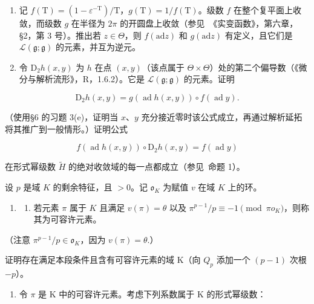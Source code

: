 \begin{enumerate}
\def\labelenumi{(\alph{enumi})}
\item
  记 \(f(\mathrm{T}) = (1 - \varepsilon^{-\mathrm{T}}) / \mathrm{T}\)，\(g(\mathrm{T}) = 1 / f(\mathrm{T})\)。级数 \(f\) 在整个复平面上收敛，而级数 \(g\) 在半径为 \(2\pi\) 的开圆盘上收敛（参见~《实变函数》，第六章，§2，第 3 号）。推出若 \(z \in \Theta\)，则 \(f(\mathrm{ad}z)\) 和 \(g(\mathrm{ad}z)\) 有定义，且它们是 \(\mathcal{L}(\mathfrak{g};\mathfrak{g})\) 的元素，并互为逆元。
\item
  令 \(\mathrm{D}_2h(x,y)\) 为 \(h\) 在点 \((x,y)\)（该点属于 \(\Theta \times \Theta\)）处的第二个偏导数（《微分与解析流形》，R，1.6.2）。它是 \(\mathcal{L}(\mathfrak{g};\mathfrak{g})\) 的元素。证明
\end{enumerate}

\[
\mathrm{D} _ {2} h (x, y) = g (\operatorname{ad} h (x, y)) \circ f (\operatorname{ad} y).
\]

（使用§6 的习题 3(e)，证明当 \(x\)、\(y\) 充分接近零时该公式成立，再通过解析延拓将其推广到一般情形。）证明公式

\[
f (\operatorname{ad} h (x, y)) \circ \mathrm{D} _ {2} h (x, y) = f (\operatorname{ad} y)
\]

在形式幂级数 \(\tilde{H}\) 的绝对收敛域的每一点都成立（参见~命题 1）。


设 \(p\) 是域 \(K\) 的剩余特征，且 \(>0\)。记 \(\mathfrak{o}_{K}\) 为赋值 \(v\) 在域 \(K\) 上的环。

\begin{enumerate}
\def\labelenumi{\arabic{enumi}.}
\tightlist
\item
  \begin{enumerate}
  \def\labelenumii{(\alph{enumii})}
  \tightlist
  \item
    若元素 \(\pi\) 属于 \(K\) 且满足 \(v(\pi) = \theta\) 以及 \(\pi^{p-1} / p \equiv -1 \pmod{\pi o_K}\)，则称其为可容许元素。
  \end{enumerate}
\end{enumerate}

（注意 \(\pi^{p-1}/p\in\mathfrak{o}_{K}\)，因为 \(v(\pi)=\theta.\)）

证明存在满足本段条件且含有可容许元素的域 K（向 \(Q_{p}\) 添加一个 \((p - 1)\) 次根 \(-p\)）。

\begin{enumerate}
\def\labelenumi{(\alph{enumi})}
\setcounter{enumi}{1}
\tightlist
\item
  令 \(\pi\) 是 K 中的可容许元素。考虑下列系数属于 K 的形式幂级数：
\end{enumerate}

